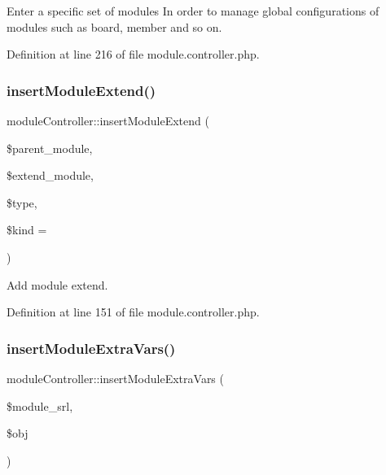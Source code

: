 Enter a specific set of modules In order to manage global configurations of modules such as board, member and so on. 



Definition at line 216 of file module.\+controller.\+php.

\hypertarget{classmoduleController_a74076ed057c3d3671a364fa478aa1109}{}\label{classmoduleController_a74076ed057c3d3671a364fa478aa1109} 
\subsubsection{\texorpdfstring{insert\+Module\+Extend()}{insertModuleExtend()}}
{\footnotesize\ttfamily module\+Controller\+::insert\+Module\+Extend (\begin{DoxyParamCaption}\item[{}]{\$parent\+\_\+module,  }\item[{}]{\$extend\+\_\+module,  }\item[{}]{\$type,  }\item[{}]{\$kind = {\ttfamily \textquotesingle{}\textquotesingle{}} }\end{DoxyParamCaption})}



Add module extend. 



Definition at line 151 of file module.\+controller.\+php.

\hypertarget{classmoduleController_a1a8373bfcd3e1e8bc88f41bb777ad486}{}\label{classmoduleController_a1a8373bfcd3e1e8bc88f41bb777ad486} 
\subsubsection{\texorpdfstring{insert\+Module\+Extra\+Vars()}{insertModuleExtraVars()}}
{\footnotesize\ttfamily module\+Controller\+::insert\+Module\+Extra\+Vars (\begin{DoxyParamCaption}\item[{}]{\$module\+\_\+srl,  }\item[{}]{\$obj }\end{DoxyParamCaption})}



